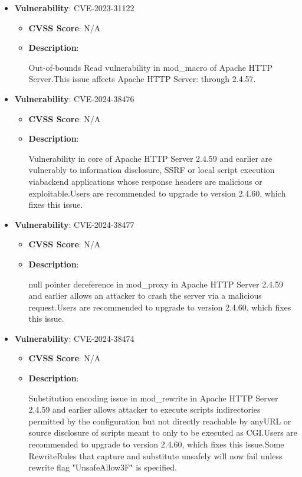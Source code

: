 \documentclass{article}
\begin{document}
\begin{itemize}
        \item \textbf{Vulnerability}: CVE-2023-31122
        \begin{itemize}
            \item \textbf{CVSS Score}:  N/A 
            \item \textbf{Description}:
            \parbox[t]{0.9\linewidth}{
                \ttfamily Out-of-bounds Read vulnerability in mod\_macro of Apache HTTP Server.This issue affects Apache HTTP Server: through 2.4.57.
            }
        \end{itemize}
    
        \item \textbf{Vulnerability}: CVE-2024-38476
        \begin{itemize}
            \item \textbf{CVSS Score}:  N/A 
            \item \textbf{Description}:
            \parbox[t]{0.9\linewidth}{
                \ttfamily Vulnerability in core of Apache HTTP Server 2.4.59 and earlier are vulnerably to information disclosure, SSRF or local script execution viabackend applications whose response headers are malicious or exploitable.Users are recommended to upgrade to version 2.4.60, which fixes this issue.
            }
        \end{itemize}
    
        \item \textbf{Vulnerability}: CVE-2024-38477
        \begin{itemize}
            \item \textbf{CVSS Score}:  N/A 
            \item \textbf{Description}:
            \parbox[t]{0.9\linewidth}{
                \ttfamily null pointer dereference in mod\_proxy in Apache HTTP Server 2.4.59 and earlier allows an attacker to crash the server via a malicious request.Users are recommended to upgrade to version 2.4.60, which fixes this issue.
            }
        \end{itemize}
    
        \item \textbf{Vulnerability}: CVE-2024-38474
        \begin{itemize}
            \item \textbf{CVSS Score}:  N/A 
            \item \textbf{Description}:
            \parbox[t]{0.9\linewidth}{
                \ttfamily Substitution encoding issue in mod\_rewrite in Apache HTTP Server 2.4.59 and earlier allows attacker to execute scripts indirectories permitted by the configuration but not directly reachable by anyURL or source disclosure of scripts meant to only to be executed as CGI.Users are recommended to upgrade to version 2.4.60, which fixes this issue.Some RewriteRules that capture and substitute unsafely will now fail unless rewrite flag "UnsafeAllow3F" is specified.
            }
        \end{itemize}
    

\end{itemize}
\end{document}
